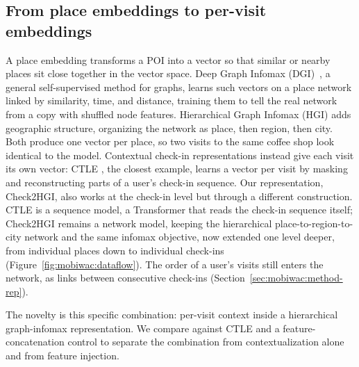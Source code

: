 \subsection{From place embeddings to per-visit embeddings}
\label{sec:mobiwac:related-embeddings}
A place embedding transforms a POI into a vector so that similar or nearby
places sit close together in the vector space.
Deep Graph Infomax (DGI)~\cite{velickovic2019deep}, a general self-supervised
method for graphs, learns such vectors on a place network linked by
similarity, time, and distance, training them to tell the real network from a
copy with shuffled node features.
Hierarchical Graph Infomax (HGI) \cite{huang2023hgi} adds geographic structure,
organizing the network as place, then region, then city. Both produce one vector per place, so two visits to the same coffee shop look
identical to the model.
Contextual check-in representations instead give each visit its own vector: CTLE
\cite{lin2021ctle}, the closest example, learns a vector per visit by masking and
reconstructing parts of a user's check-in sequence. Our
representation, Check2HGI, also works at the check-in level but through a
different construction. CTLE is a sequence model, a Transformer that reads the
check-in sequence itself; Check2HGI remains a network model, keeping the
hierarchical place-to-region-to-city network and the same infomax objective,
now extended one level deeper, from individual places down to individual
check-ins (Figure~\ref{fig:mobiwac:dataflow}). The order of a user's visits still enters
the network, as links between consecutive check-ins
(Section~\ref{sec:mobiwac:method-rep}).

The novelty is this specific combination: per-visit context inside a
hierarchical graph-infomax representation. We compare against CTLE and a feature-concatenation control to separate the
combination from contextualization alone and from feature injection.

